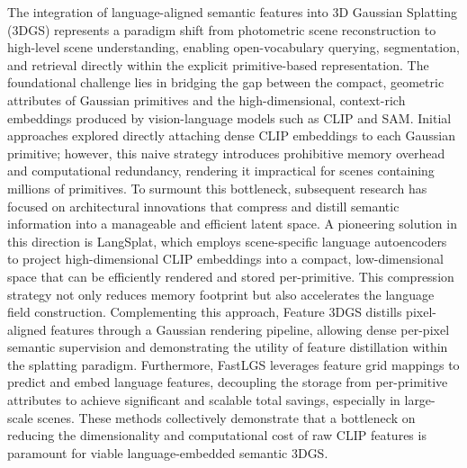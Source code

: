 \documentclass[11pt,a4paper]{article}
\begin{document}
The integration of language-aligned semantic features into 3D Gaussian Splatting (3DGS) represents a paradigm shift from photometric scene reconstruction to high-level scene understanding, enabling open-vocabulary querying, segmentation, and retrieval directly within the explicit primitive-based representation. The foundational challenge lies in bridging the gap between the compact, geometric attributes of Gaussian primitives and the high-dimensional, context-rich embeddings produced by vision-language models such as CLIP and SAM. Initial approaches explored directly attaching dense CLIP embeddings to each Gaussian primitive; however, this naive strategy introduces prohibitive memory overhead and computational redundancy, rendering it impractical for scenes containing millions of primitives. To surmount this bottleneck, subsequent research has focused on architectural innovations that compress and distill semantic information into a manageable and efficient latent space. A pioneering solution in this direction is LangSplat, which employs scene-specific language autoencoders to project high-dimensional CLIP embeddings into a compact, low-dimensional space that can be efficiently rendered and stored per-primitive. This compression strategy not only reduces memory footprint but also accelerates the language field construction. Complementing this approach, Feature 3DGS distills pixel-aligned features through a Gaussian rendering pipeline, allowing dense per-pixel semantic supervision and demonstrating the utility of feature distillation within the splatting paradigm. Furthermore, FastLGS leverages feature grid mappings to predict and embed language features, decoupling the storage from per-primitive attributes to achieve significant and scalable total savings, especially in large-scale scenes. These methods collectively demonstrate that a bottleneck on reducing the dimensionality and computational cost of raw CLIP features is paramount for viable language-embedded semantic 3DGS.
\end{document}
